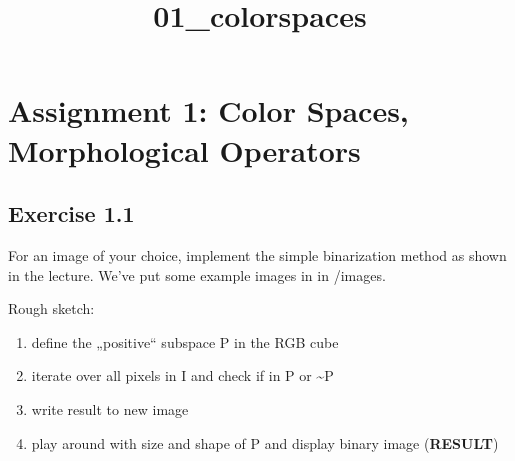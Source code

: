 \documentclass[11pt]{article}
\title{01\_colorspaces}
\providecommand{\tightlist}{%
      \setlength{\itemsep}{0pt}\setlength{\parskip}{0pt}}
\begin{document}
    
    
    \maketitle
    
    

    
    \hypertarget{assignment-1-color-spaces-morphological-operators}{%
\section{Assignment 1: Color Spaces, Morphological
Operators}\label{assignment-1-color-spaces-morphological-operators}}

    \hypertarget{exercise-1.1}{%
\subsection{Exercise 1.1}\label{exercise-1.1}}

    For an image of your choice, implement the simple binarization method as
shown in the lecture. We've put some example images in in /images.

Rough sketch:

\begin{enumerate}
\def\labelenumi{\arabic{enumi}.}
\tightlist
\item
  define the „positive`` subspace P in the RGB cube
\item
  iterate over all pixels in I and check if in P or \textasciitilde P
\item
  write result to new image
\item
  play around with size and shape of P and display binary image
  (\textbf{RESULT})
\end{enumerate}
\end{document}
